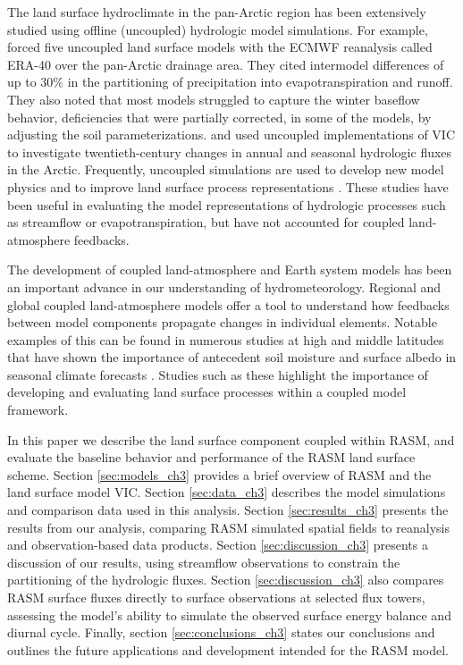 The land surface hydroclimate in the pan-Arctic region has been extensively studied using offline (uncoupled) hydrologic model simulations.
For example, \citet{Slater_2007} forced five uncoupled land surface models with the ECMWF reanalysis called ERA-40 over the pan-Arctic drainage area.
They cited intermodel differences of up to 30\% in the partitioning of precipitation into evapotranspiration and runoff.
They also noted that most models struggled to capture the winter baseflow behavior, deficiencies that were partially corrected, in some of the models, by adjusting the soil parameterizations.
\citet{Adam_2007} and \citet{Tan_2011} used uncoupled implementations of VIC to investigate twentieth-century changes in annual and seasonal hydrologic fluxes in the Arctic.
Frequently, uncoupled simulations are used to develop new model physics and to improve land surface process representations \citep{Bonan_2011,Bowling_2004,Bowling_2010,Cherkauer_2003,Swenson_2012}.
These studies have been useful in evaluating the model representations of hydrologic processes such as streamflow or evapotranspiration, but have not accounted for coupled land-atmosphere feedbacks.

The development of coupled land-atmosphere and Earth system models has been an important advance in our understanding of hydrometeorology.
Regional and global coupled land-atmosphere models offer a tool to understand how feedbacks between model components propagate changes in individual elements.
Notable examples of this can be found in numerous studies at high and middle latitudes that have shown the importance of antecedent soil moisture and surface albedo in seasonal climate forecasts \citep{Beljaars_1996,Betts_2004,Dominguez_2006,Koster_2004}.
Studies such as these highlight the importance of developing and evaluating land surface processes within a coupled model framework.

In this paper we describe the land surface component coupled within RASM, and evaluate the baseline behavior and performance of the RASM land surface scheme.
Section \ref{sec:models_ch3} provides a brief overview of RASM and the land surface model VIC.
Section \ref{sec:data_ch3} describes the model simulations and comparison data used in this analysis.
Section \ref{sec:results_ch3} presents the results from our analysis, comparing RASM simulated spatial fields to reanalysis and observation-based data products.
Section \ref{sec:discussion_ch3} presents a discussion of our results, using streamflow observations to constrain the partitioning of the hydrologic fluxes.
Section \ref{sec:discussion_ch3} also compares RASM surface fluxes directly to surface observations at selected flux towers, assessing the model’s ability to simulate the observed surface energy balance and diurnal cycle.
Finally, section \ref{sec:conclusions_ch3} states our conclusions and outlines the future applications and development intended for the RASM model.

